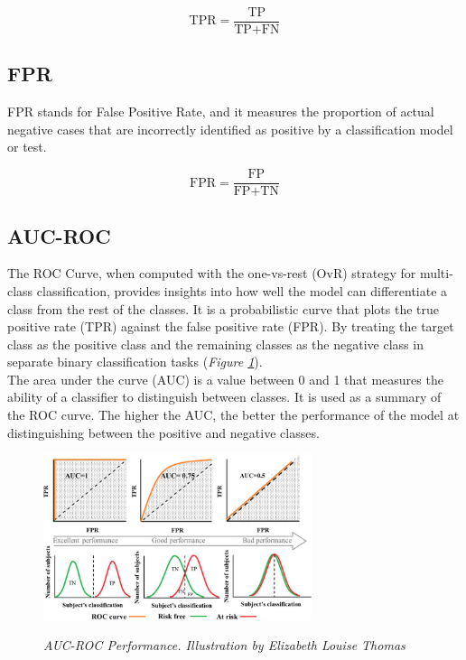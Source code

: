 \[
  \text{TPR} = \frac{\text{TP}}{\text{TP} + \text{FN}}
\]

\subsection{FPR}

FPR stands for False Positive Rate, and it measures the proportion of actual
negative cases that are incorrectly identified as positive by a classification
model or test.

\[ \text{FPR} = \frac{\text{FP}}{\text{FP} + \text{TN}} \]

\subsection{AUC-ROC}

The ROC Curve, when computed with the one-vs-rest (OvR) strategy for
multi-class classification, provides insights into how well the model can
differentiate a class from the rest of the classes. It is a probabilistic curve
that plots the true positive rate (TPR) against the false positive rate (FPR).
By treating the target class as the positive class and the remaining classes as
the negative class in separate binary classification tasks (\textit{Figure
\ref{fig:auc-roc}}). \\

The area under the curve (AUC) is a value between 0 and 1 that measures the
ability of a classifier to distinguish between classes. It is used as a summary
of the ROC curve. The higher the AUC, the better the performance of the model
at distinguishing between the positive and negative classes.

\begin{figure}[H]
  \centering
  \includegraphics[width=0.7\textwidth]{imatges/preliminaries/auc.png}
  \caption[AUC-ROC Performance]{\textit{AUC-ROC Performance. Illustration by Elizabeth Louise Thomas}}
  {\label{fig:auc-roc}}
\end{figure}

